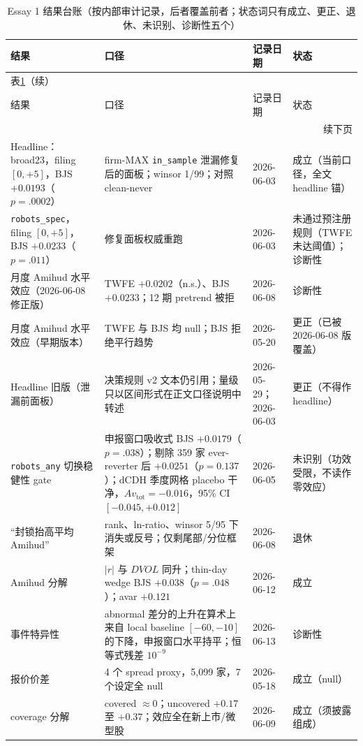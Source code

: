 \documentclass[a4paper,11pt]{ctexart}
\begin{document}
{\small
\begin{longtable}{p{}p{}p{}p{}}
\caption{Essay 1 结果台账（按内部审计记录，后者覆盖前者；状态词只有成立、更正、退休、未识别、诊断性五个）}\label{tab:02-ledger}\\
\toprule
结果 & 口径 & 记录日期 & 状态 \\
\midrule
\endfirsthead
\multicolumn{4}{l}{表\ref{tab:02-ledger}（续）}\\
\toprule
结果 & 口径 & 记录日期 & 状态 \\
\midrule
\endhead
\midrule
\multicolumn{4}{r}{续下页}\\
\endfoot
\bottomrule
\endlastfoot
Headline：broad23，filing $[0,+5]$，BJS $+0.0193$（$p=.0002$） & firm-MAX \texttt{in\_sample} 泄漏修复后的面板；winsor 1/99；对照 clean-never & 2026-06-03 & 成立（当前口径，全文 headline 锚） \\
\texttt{robots\_spec}，filing $[0,+5]$，BJS $+0.0233$（$p=.011$） & 修复面板权威重跑 & 2026-06-03 & 未通过预注册规则（TWFE 未达阈值）；诊断性 \\
月度 Amihud 水平效应（2026-06-08 修正版） & TWFE $+0.0202$（n.s.）、BJS $+0.0233$；12 期 pretrend 被拒 & 2026-06-08 & 诊断性 \\
月度 Amihud 水平效应（早期版本） & TWFE 与 BJS 均 null；BJS 拒绝平行趋势 & 2026-05-20 & 更正（已被 2026-06-08 版覆盖） \\
Headline 旧版（泄漏前面板） & 决策规则 v2 文本仍引用；量级只以区间形式在正文口径说明中转述 & 2026-05-29；2026-06-03 & 更正（不得作 headline） \\
\texttt{robots\_any} 切换稳健性 gate & 申报窗口吸收式 BJS $+0.0179$（$p=.038$）；剔除 359 家 ever-reverter 后 $+0.0251$（$p=0.137$）；dCDH 季度网格 placebo 干净，$Av_{\mathrm{tot}}=-0.016$，95\% CI $[-0.045,+0.012]$ & 2026-06-05 & 未识别（功效受限，不读作零效应） \\
“封锁抬高平均 Amihud” & rank、ln-ratio、winsor 5/95 下消失或反号；仅剩尾部/分位框架 & 2026-06-08 & 退休 \\
Amihud 分解 & $|r|$ 与 $DVOL$ 同升；thin-day wedge BJS $+0.038$（$p=.048$）；avar $+0.121$ & 2026-06-12 & 成立 \\
事件特异性 & abnormal 差分的上升在算术上来自 local baseline $[-60,-10]$ 的下降，申报窗口水平持平；恒等式残差 $10^{-9}$ & 2026-06-13 & 诊断性 \\
报价价差 & 4 个 spread proxy，5,099 家，7 个设定全 null & 2026-05-18 & 成立（null） \\
coverage 分解 & covered $\approx 0$；uncovered $+0.17$ 至 $+0.37$；效应全在新上市/微型股 & 2026-06-09 & 成立（须披露组成） \\

\end{longtable}}
\end{document}
